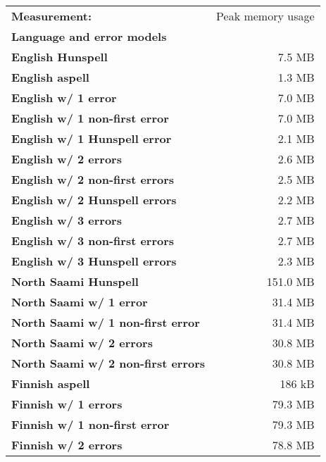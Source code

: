 \documentclass[a4paper,12pt]{article}
\begin{document}
\begin{table}
    \centering
    \begin{tabular}{|l|r|}
        \hline
        \bf Measurement: & Peak memory usage \\
        \bf Language and error models & \\
        \hline
        \bf English Hunspell & 7.5 MB \\
          \bf English aspell & 1.3 MB \\
        \hline
        \bf English w/ 1 error & 7.0 MB \\
 \bf English w/ 1 non-first error & 7.0 MB \\
 \bf English w/ 1 Hunspell error & 2.1 MB \\
     \bf English w/ 2 errors & 2.6 MB \\
 \bf English w/ 2 non-first errors & 2.5 MB \\
 \bf English w/ 2 Hunspell errors & 2.2 MB \\
   \bf English w/ 3 errors & 2.7 MB \\
 \bf English w/ 3 non-first errors & 2.7 MB \\
 \bf English w/ 3 Hunspell errors & 2.3 MB \\
        \hline
   \bf North Saami Hunspell & 151.0 MB \\
        \hline
        \bf North Saami w/ 1 error & 31.4 MB \\
\bf North Saami w/ 1 non-first error & 31.4 MB \\
       \bf North Saami w/ 2 errors & 30.8 MB \\
\bf North Saami w/ 2 non-first errors & 30.8 MB \\
        \hline
        \bf Finnish aspell & 186 kB \\
        \hline
        \bf Finnish w/ 1 errors & 79.3 MB \\
\bf Finnish w/ 1 non-first error & 79.3 MB \\
        \bf Finnish w/ 2 errors & 78.8 MB \\

\end{tabular}
\end{table}
\end{document}
